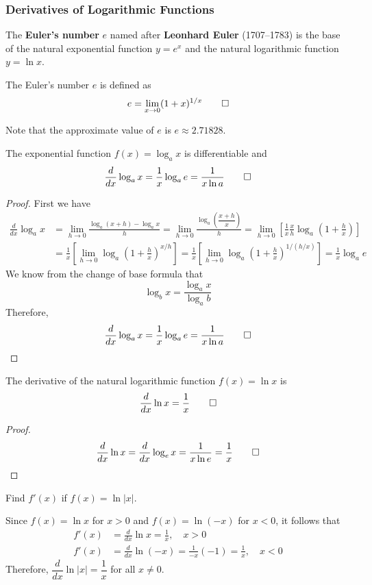 \subsubsection{Derivatives of Logarithmic Functions}
The \textbf{Euler's number} \(e\) named after \textbf{Leonhard Euler} (1707--1783)
is the base of the natural exponential function \(y=e^x\) and the natural
logarithmic function \(y=\ln x\).
\begin{definition}
    The Euler's number \(e\) is defined as
    \[e=\lim_{x\to 0}(1+x)^{1/x}\qedhere\]
\end{definition}
Note that the approximate value of \(e\) is \(e\approx2.71828\).
\begin{theorem}
    The exponential function \(f(x)=\log_a x\) is differentiable and
    \[\frac{d}{dx}\log_a x=\frac{1}{x}\log_a e=\frac{1}{x\ln a}\qedhere\]
\end{theorem}
\begin{proof}
    First we have
    \begin{align*}
        \frac{d}{dx}\log_a x &= \lim_{h\to 0}\frac{\log_a(x+h)-\log_a x}{h}
        =\lim_{h\to 0}\frac{\log_a\left(\dfrac{x+h}{x}\right)}{h}
        =\lim_{h\to 0}\left[\frac{1}{x}\frac{x}{h}
        \log_a\left(1+\frac{h}{x}\right)\right] \\
        &= \frac{1}{x}\left[
            \lim_{h\to 0}\log_a\left(1+\frac{h}{x}\right)^{x/h}\right]
        =\frac{1}{x}\left[
            \lim_{h\to 0}\log_a\left(1+\frac{h}{x}\right)^{1/(h/x)}\right]
        =\frac{1}{x}\log_a e
    \end{align*}
    We know from the change of base formula that
    \[\log_b x=\frac{\log_a x}{\log_a b}\]
    Therefore,
    \[\frac{d}{dx}\log_a x=\frac{1}{x}\log_a e=\frac{1}{x\ln a}\qedhere\]
\end{proof}
\begin{theorem}
    The derivative of the natural logarithmic function \(f(x)=\ln x\) is
    \[\frac{d}{dx}\ln x=\frac{1}{x}\qedhere\]
\end{theorem}
\begin{proof}
    \[\frac{d}{dx}\ln x=\frac{d}{dx}\log_e x=\frac{1}{x\ln e}
    =\frac{1}{x}\qedhere\]
\end{proof}
\begin{problem}
    Find \(f'(x)\) if \(f(x)=\ln|x|\).
\end{problem}
\begin{solution}
    Since \(f(x)=\ln x\) for \(x>0\) and \(f(x)=\ln(-x)\) for \(x<0\),
    it follows that
    \begin{align*}
        f'(x) &= \frac{d}{dx}\ln x=\frac{1}{x},\quad x>0 \\
        f'(x) &= \frac{d}{dx}\ln(-x)=\frac{1}{-x}(-1)=\frac{1}{x},\quad x<0
    \end{align*}
    Therefore, \(\dfrac{d}{dx}\ln|x|=\dfrac{1}{x}\) for all \(x\neq 0\).
\end{solution}

